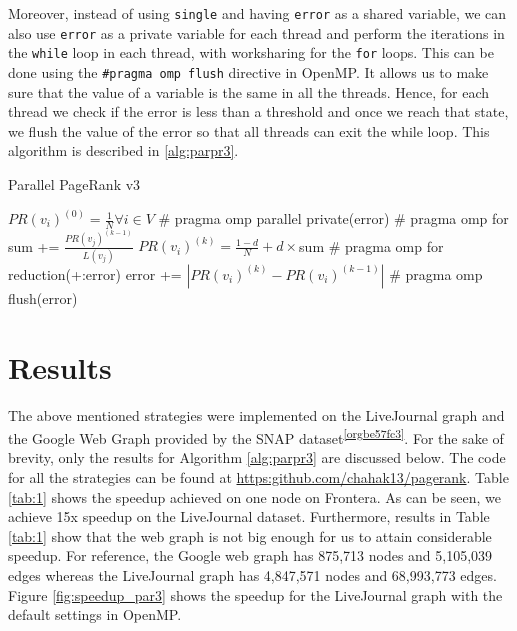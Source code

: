 \documentclass[11pt]{article}
\begin{document}
Moreover, instead of using \texttt{single} and having \texttt{error} as a shared variable, we can also use \texttt{error} as a private variable for each thread and perform the iterations in the \texttt{while} loop in each thread, with worksharing for the \texttt{for} loops. This can be done using the \texttt{\#pragma omp flush} directive in OpenMP. It allows us to make sure that the value of a variable is the same in all the threads. Hence, for each thread we check if the error is less than a threshold and once we reach that state, we flush the value of the error so that all threads can exit the while loop. This algorithm is described in \ref{alg:parpr3}.

\begin{algorithm}
\caption{Parallel PageRank v3}\label{alg:parpr3}
\begin{algorithmic}
\Require $PR(v_{i})^{(0)} = \frac{1}{N} \forall i \in V$
\State \# pragma omp parallel private(error)
\State \# pragma omp for
\State sum += $ \frac{PR (v_j)^{(k-1)}}{L(v_j)}$
\EndFor
\State $PR(v_{i})^{(k)} = \frac{1-d}{N} + d \times$sum
\EndFor
\State \# pragma omp for reduction(+:error)
\State error += $ |PR(v_{i})^{(k)} - PR(v_{i})^{(k-1)}|$
\EndFor
{}
\State \# pragma omp flush(error)
\EndIf
\EndWhile
\end{algorithmic}
\end{algorithm}

\section{Results}
\label{sec:orga176164}
The above mentioned strategies were implemented on the LiveJournal graph and the Google Web Graph provided by the SNAP dataset\textsuperscript{\ref{orgbe57fc3}}. For the sake of brevity, only the results for Algorithm \ref{alg:parpr3} are discussed below. The code for all the strategies can be found at \url{https:github.com/chahak13/pagerank}. Table \ref{tab:1} shows the speedup achieved on one node on Frontera. As can be seen, we achieve 15x speedup on the LiveJournal dataset. Furthermore, results in Table \ref{tab:1} show that the web graph is not big enough for us to attain considerable speedup. For reference, the Google web graph has 875,713 nodes and 5,105,039 edges whereas the LiveJournal graph has 4,847,571 nodes and 68,993,773 edges. Figure \ref{fig:speedup_par3} shows the speedup for the LiveJournal graph with the default settings in OpenMP.
\end{document}
